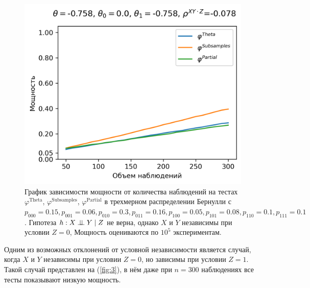 \begin{figure}[H]
    \centering
    \includegraphics[scale=0.6]{images/graph3.png}
    \caption{График зависимости мощности от количества наблюдений
    на тестах $\varphi^{\text{Theta}}$, $\varphi^{\text{Subsamples}}$, $\varphi^{\text{Partial}}$
    в трехмерном распределении Бернулли с $p_{000}=0.15, p_{001}=0.06, 
    p_{010}=0.3, p_{011}=0.16,
    p_{100}=0.05, p_{101}=0.08, p_{110}=0.1, p_{111}=0.1$. 
    Гипотеза $h: X \perp\!\!\!\perp Y \mid Z$ не верна, однако $X$ и $Y$ независимы
    при условии $Z=0$, 
    Мощность оцениваются по $10^5$ экспериментам.}\label{fig:3}
\end{figure}

Одним из возможных отклонений от условной независимости является случай,
когда $X$ и $Y$ независимы при условии $Z=0$, но зависимы при условии $Z=1$.
Такой случай представлен на (\autoref{fig:3}), в нём даже при $n=300$ наблюдениях все тесты показывают
низкую мощность.

